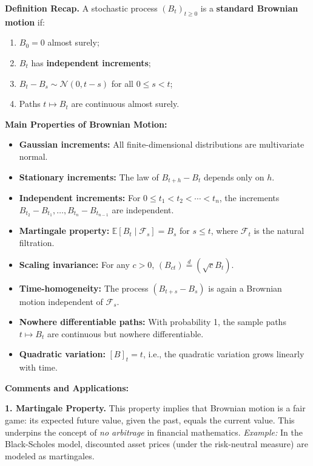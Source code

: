 
\textbf{Definition Recap.}  
A stochastic process \( (B_t)_{t \geq 0} \) is a \textbf{standard Brownian motion} if:
\begin{enumerate}
  \item \( B_0 = 0 \) almost surely;
  \item \( B_t \) has \textbf{independent increments};
  \item \( B_t - B_s \sim \mathcal{N}(0, t - s) \) for all \( 0 \leq s < t \);
  \item Paths \( t \mapsto B_t \) are continuous almost surely.
\end{enumerate}

\vspace{1em}
\textbf{Main Properties of Brownian Motion:}
\begin{itemize}
  \item \textbf{Gaussian increments:} All finite-dimensional distributions are multivariate normal.
  \item \textbf{Stationary increments:} The law of \( B_{t+h} - B_t \) depends only on \( h \).
  \item \textbf{Independent increments:} For \( 0 \leq t_1 < t_2 < \cdots < t_n \), the increments \( B_{t_2} - B_{t_1}, \dots, B_{t_n} - B_{t_{n-1}} \) are independent.
  \item \textbf{Martingale property:} \( \mathbb{E}[B_t \mid \mathcal{F}_s] = B_s \) for \( s \leq t \), where \( \mathcal{F}_t \) is the natural filtration.
  \item \textbf{Scaling invariance:} For any \( c > 0 \), \( (B_{ct}) \overset{d}{=} (\sqrt{c} B_t) \).
  \item \textbf{Time-homogeneity:} The process \( (B_{t+s} - B_s) \) is again a Brownian motion independent of \( \mathcal{F}_s \).
  \item \textbf{Nowhere differentiable paths:} With probability 1, the sample paths \( t \mapsto B_t \) are continuous but nowhere differentiable.
  \item \textbf{Quadratic variation:} \( [B]_t = t \), i.e., the quadratic variation grows linearly with time.
\end{itemize}

\vspace{1em}
\textbf{Comments and Applications:}

\textbf{1. Martingale Property.}  
This property implies that Brownian motion is a fair game: its expected future value, given the past, equals the current value. This underpins the concept of \textit{no arbitrage} in financial mathematics.  
\textit{Example:} In the Black-Scholes model, discounted asset prices (under the risk-neutral measure) are modeled as martingales.

